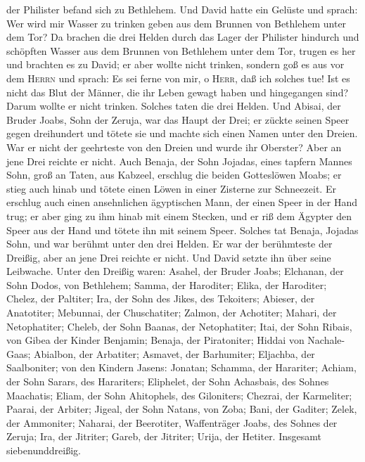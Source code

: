 der Philister befand sich zu Bethlehem.  Und David hatte
ein Gelüste und sprach: Wer wird mir Wasser zu trinken geben aus dem
Brunnen von Bethlehem unter dem Tor?  Da brachen die drei
Helden durch das Lager der Philister hindurch und schöpften Wasser aus
dem Brunnen von Bethlehem unter dem Tor, trugen es her und brachten es
zu David; er aber wollte nicht trinken, sondern goß es aus vor dem
\textsc{Herrn}  und sprach: Es sei ferne von mir, o
\textsc{Herr}, daß ich solches tue! Ist es nicht das Blut der Männer,
die ihr Leben gewagt haben und hingegangen sind? Darum wollte er nicht
trinken. Solches taten die drei Helden.  Und Abisai, der
Bruder Joabs, Sohn der Zeruja, war das Haupt der Drei; er zückte seinen
Speer gegen dreihundert und tötete sie und machte sich einen Namen unter
den Dreien.  War er nicht der geehrteste von den Dreien
und wurde ihr Oberster? Aber an jene Drei reichte er nicht.
 Auch Benaja, der Sohn Jojadas, eines tapfern Mannes
Sohn, groß an Taten, aus Kabzeel, erschlug die beiden Gotteslöwen Moabs;
er stieg auch hinab und tötete einen Löwen in einer Zisterne zur
Schneezeit.  Er erschlug auch einen ansehnlichen
ägyptischen Mann, der einen Speer in der Hand trug; er aber ging zu ihm
hinab mit einem Stecken, und er riß dem Ägypter den Speer aus der Hand
und tötete ihn mit seinem Speer.  Solches tat Benaja,
Jojadas Sohn, und war berühmt unter den drei Helden.  Er
war der berühmteste der Dreißig, aber an jene Drei reichte er nicht. Und
David setzte ihn über seine Leibwache.  Unter den Dreißig
waren: Asahel, der Bruder Joabs; Elchanan, der Sohn Dodos, von
Bethlehem;  Samma, der Haroditer; Elika, der Haroditer;
 Chelez, der Paltiter; Ira, der Sohn des Jikes, des
Tekoiters;  Abieser, der Anatotiter; Mebunnai, der
Chuschatiter;  Zalmon, der Achotiter; Mahari, der
Netophatiter;  Cheleb, der Sohn Baanas, der Netophatiter;
Itai, der Sohn Ribais, von Gibea der Kinder Benjamin; 
Benaja, der Piratoniter; Hiddai von Nachale-Gaas; 
Abialbon, der Arbatiter; Asmavet, der Barhumiter; 
Eljachba, der Saalboniter; von den Kindern Jasens: Jonatan;
 Schamma, der Harariter; Achiam, der Sohn Sarars, des
Harariters;  Eliphelet, der Sohn Achasbais, des Sohnes
Maachatis; Eliam, der Sohn Ahitophels, des Giloniters; 
Chezrai, der Karmeliter; Paarai, der Arbiter;  Jigeal,
der Sohn Natans, von Zoba; Bani, der Gaditer;  Zelek, der
Ammoniter; Naharai, der Beerotiter, Waffenträger Joabs, des Sohnes der
Zeruja;  Ira, der Jitriter; Gareb, der Jitriter;
 Urija, der Hetiter. Insgesamt siebenunddreißig.

